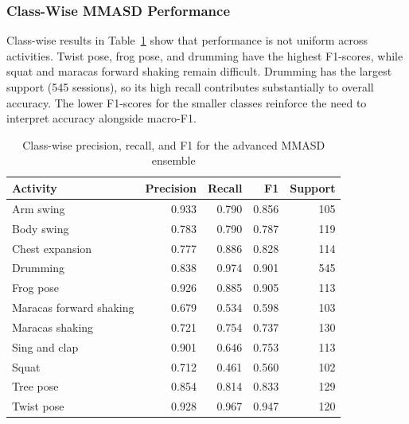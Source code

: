 \documentclass[a4paper,12pt]{report}
\begin{document}
\subsubsection*{Class-Wise MMASD Performance}

Class-wise results in Table~\ref{tab:mmasd_classes} show that performance is not uniform across activities. Twist pose, frog pose, and drumming have the highest F1-scores, while squat and maracas forward shaking remain difficult. Drumming has the largest support (545 sessions), so its high recall contributes substantially to overall accuracy. The lower F1-scores for the smaller classes reinforce the need to interpret accuracy alongside macro-F1.

\begin{table}[htbp]
\centering
\scriptsize
\caption{Class-wise precision, recall, and F1 for the advanced MMASD ensemble}
\label{tab:mmasd_classes}
\begin{tabular}{p{4.8cm}rrrr}
\hline
\textbf{Activity} & \textbf{Precision} & \textbf{Recall} & \textbf{F1} & \textbf{Support} \\
\hline
Arm swing & 0.933 & 0.790 & 0.856 & 105 \\
Body swing & 0.783 & 0.790 & 0.787 & 119 \\
Chest expansion & 0.777 & 0.886 & 0.828 & 114 \\
Drumming & 0.838 & 0.974 & 0.901 & 545 \\
Frog pose & 0.926 & 0.885 & 0.905 & 113 \\
Maracas forward shaking & 0.679 & 0.534 & 0.598 & 103 \\
Maracas shaking & 0.721 & 0.754 & 0.737 & 130 \\
Sing and clap & 0.901 & 0.646 & 0.753 & 113 \\
Squat & 0.712 & 0.461 & 0.560 & 102 \\
Tree pose & 0.854 & 0.814 & 0.833 & 129 \\
Twist pose & 0.928 & 0.967 & 0.947 & 120 \\
\hline
\end{tabular}
\end{table}

\end{document}
